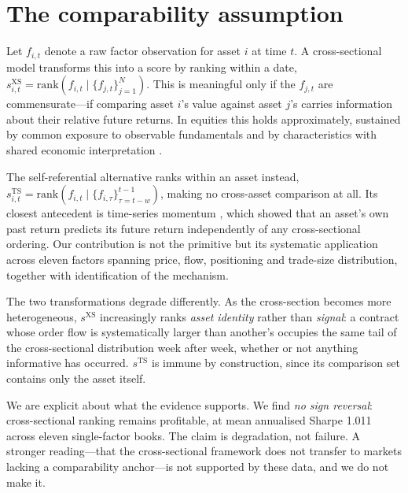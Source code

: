 \documentclass[11pt,letterpaper]{article}
\begin{document}
\section{The comparability assumption}

Let $f_{i,t}$ denote a raw factor observation for asset $i$ at time $t$. A
cross-sectional model transforms this into a score by ranking within a date,
$s^{\mathrm{XS}}_{i,t} = \mathrm{rank}\!\left(f_{i,t} \mid \{f_{j,t}\}_{j=1}^{N}\right)$.
This is meaningful only if the $f_{j,t}$ are commensurate---if comparing asset
$i$'s value against asset $j$'s carries information about their relative future
returns. In equities this holds approximately, sustained by common exposure to
observable fundamentals \citep{famafrench1993} and by characteristics with
shared economic interpretation \citep{danieltitman1997}.

The self-referential alternative ranks within an asset instead,
$s^{\mathrm{TS}}_{i,t} = \mathrm{rank}\!\left(f_{i,t} \mid \{f_{i,\tau}\}_{\tau=t-w}^{t-1}\right)$,
making no cross-asset comparison at all. Its closest antecedent is time-series
momentum \citep{moskowitz2012}, which showed that an asset's own past return
predicts its future return independently of any cross-sectional ordering. Our
contribution is not the primitive but its systematic application across eleven
factors spanning price, flow, positioning and trade-size distribution, together
with identification of the mechanism.

The two transformations degrade differently. As the cross-section becomes more
heterogeneous, $s^{\mathrm{XS}}$ increasingly ranks \emph{asset identity} rather
than \emph{signal}: a contract whose order flow is systematically larger than
another's occupies the same tail of the cross-sectional distribution week after
week, whether or not anything informative has occurred. $s^{\mathrm{TS}}$ is
immune by construction, since its comparison set contains only the asset itself.

We are explicit about what the evidence supports. We find \emph{no sign
reversal}: cross-sectional ranking remains profitable, at mean annualised Sharpe
1.011 across eleven single-factor books. The claim is degradation, not failure.
A stronger reading---that the cross-sectional framework does not transfer to
markets lacking a comparability anchor---is not supported by these data, and we
do not make it.

\end{document}
